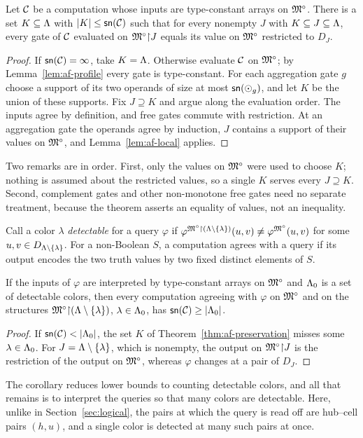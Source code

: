\begin{theorem}\label{thm:af-preservation}
Let $\mathcal C$ be a computation whose inputs are type-constant arrays on
$\mathfrak M^\circ$. There is a set $K\subseteq\Lambda$ with $|K|\le\mathsf{sn}(\mathcal C)$ such
that for every nonempty $J$ with $K\subseteq J\subseteq\Lambda$, every gate
of $\mathcal C$ evaluated on $\mathfrak M^\circ\mathord{\restriction} J$ equals its value on $\mathfrak M^\circ$
restricted to $D_J$.
\end{theorem}
\begin{proof}
If $\mathsf{sn}(\mathcal C)=\infty$, take $K=\Lambda$. Otherwise evaluate $\mathcal C$ on
$\mathfrak M^\circ$; by Lemma~\ref{lem:af-profile} every gate is type-constant. For
each aggregation gate $g$ choose a support of its two operands of size at
most $\mathsf{sn}(\odot_g)$, and let $K$ be the union of these supports. Fix
$J\supseteq K$ and argue along the evaluation order. The inputs agree by
definition, and free gates commute with restriction. At an aggregation
gate the operands agree by induction, $J$ contains a support of their
values on $\mathfrak M^\circ$, and Lemma~\ref{lem:af-local} applies.
\end{proof}
Two remarks are in order. First, only the values on $\mathfrak M^\circ$ were used
to choose $K$; nothing is assumed about the restricted values, so a single
$K$ serves every $J\supseteq K$. Second, complement gates and other
non-monotone free gates need no separate treatment, because the theorem
asserts an equality of values, not an inequality.

Call a color $\lambda$ \emph{detectable} for a query $\varphi$ if
$\varphi^{\mathfrak M^\circ\mathord{\restriction}(\Lambda\setminus\{\lambda\})}(u,v)\ne\varphi^{\mathfrak M^\circ}(u,v)$
for some $u,v\in D_{\Lambda\setminus\{\lambda\}}$. For a non-Boolean $S$, a
computation agrees with a query if its output encodes the two truth values
by two fixed distinct elements of $S$.

\begin{corollary}\label{cor:af-detectable}
If the inputs of $\varphi$ are interpreted by type-constant arrays on
$\mathfrak M^\circ$ and $\Lambda_0$ is a set of detectable colors, then every
computation agreeing with $\varphi$ on $\mathfrak M^\circ$ and on the structures
$\mathfrak M^\circ\mathord{\restriction}(\Lambda\setminus\{\lambda\})$, $\lambda\in\Lambda_0$, has
$\mathsf{sn}(\mathcal C)\ge|\Lambda_0|$.
\end{corollary}
\begin{proof}
If $\wid\Comp<|\Det|$, the set $K$ of Theorem~\ref{thm:af-preservation}
misses some $\lambda\in\Lambda_0$. For $J=\Lambda\setminus\{\lambda\}$, which is
nonempty, the output on $\mathfrak M^\circ\mathord{\restriction} J$ is the restriction of the output
on $\mathfrak M^\circ$, whereas $\varphi$ changes at a pair of $D_J$.
\end{proof}
The corollary reduces lower bounds to counting detectable colors, and all
that remains is to interpret the queries so that many colors are
detectable. Here, unlike in Section~\ref{sec:logical}, the pairs at which
the query is read off are hub--cell pairs $(h,u)$, and a single color is
detected at many such pairs at once.

